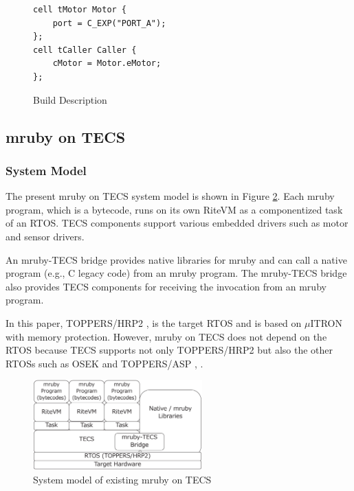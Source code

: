 \documentclass[S,R,E]{article/compsoft}
\begin{document}
\begin{description}
\begin{figure}[t]
\centering
\begin{lstlisting}
cell tMotor Motor {
    port = C_EXP("PORT_A");
};
cell tCaller Caller {
    cMotor = Motor.eMotor;
};
\end{lstlisting}
\caption{Build Description}
\label{build}
\end{figure}

\end{description}

\subsection{mruby on TECS}
\label{sec:mruby on TECS}

\subsubsection{System Model}
The present mruby on TECS system model is shown in Figure \ref{fig:mrubyontecs}.
Each mruby program, which is a bytecode, runs on its own RiteVM as a componentized task of an RTOS.
TECS components support various embedded drivers such as motor and sensor drivers.

An mruby-TECS bridge provides native libraries for mruby and can call a native program (e.g., C legacy code) from an mruby program.
The mruby-TECS bridge also provides TECS components for receiving the invocation from an mruby program.

In this paper, TOPPERS/HRP2 \cite{url:HRP2}, \cite{par:hr-tecs} is the target RTOS and is based on $\mu$ITRON \cite{par:microITRON} with memory protection.
However, mruby on TECS does not depend on the RTOS because TECS supports not only TOPPERS/HRP2 but also the other RTOSs such as OSEK \cite{par:OSEK} and TOPPERS/ASP \cite{par:ASP}, \cite{url:ASP}.

\begin{figure}[t]
    \centering
    \includegraphics[width=6.5cm,clip]{figure/mrubyontecs.eps}
\caption{System model of existing mruby on TECS}
\label{fig:mrubyontecs}
\end{figure}
\end{document}
